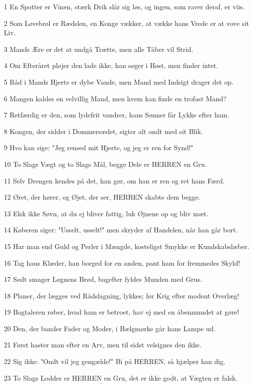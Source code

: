 \par 1 En Spotter er Vinen, stærk Drik slår sig løs, og ingen, som raver deraf, er viis.
\par 2 Som Løvebrøl er Rædslen, en Konge vækker, at vække hans Vrede er at vove sit Liv.
\par 3 Mands Ære er det at undgå Trætte, men alle Tåber vil Strid.
\par 4 Om Efteråret pløjer den lade ikke, han søger i Høst, men finder intet.
\par 5 Råd i Mands Hjerte er dybe Vande, men Mand med Indsigt drager det op.
\par 6 Mangen kaldes en velvillig Mand, men hvem kan finde en trofast Mand?
\par 7 Retfærdig er den, som lydefrit vandrer, hans Sønner får Lykke efter ham.
\par 8 Kongen, der sidder i Dommersædet, sigter alt ondt med sit Blik.
\par 9 Hvo kan sige: "Jeg rensed mit Hjerte, og jeg er ren for Synd!"
\par 10 To Slags Vægt og to Slags Mål, begge Dele er HERREN en Gru.
\par 11 Selv Drengen kendes på det, han gør, om han er ren og ret hans Færd.
\par 12 Øret, der hører, og Øjet, der ser, HERREN skabte dem begge.
\par 13 Elsk ikke Søvn, at du ej bliver fattig, luk Øjnene op og bliv mæt.
\par 14 Køberen siger: "Usselt, usselt!" men skryder af Handelen, når han går bort.
\par 15 Har man end Guld og Perler i Mængde, kosteligst Smykke er Kundskabslæber.
\par 16 Tag hans Klæder, han borged for en anden, pant ham for fremmedes Skyld!
\par 17 Sødt smager Løgnens Brød, bagefter fyldes Munden med Grus.
\par 18 Planer, der lægges ved Rådslagning, lykkes; før Krig efter modent Overlæg!
\par 19 Bagtaleren røber, hvad ham er betroet, hav ej med en åbenmundet at gøre!
\par 20 Den, der bander Fader og Moder, i Bælgmørke går hans Lampe ud.
\par 21 Først haster man efter en Arv, men til sidst velsignes den ikke.
\par 22 Sig ikke: "Ondt vil jeg gengælde!" Bi på HERREN, så hjælper han dig.
\par 23 To Slags Lodder er HERREN en Gru, det er ikke godt, at Vægten er falsk.
